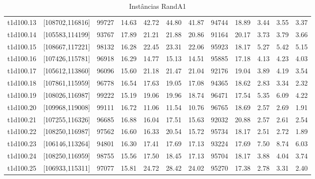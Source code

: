 \documentclass[a4paper,10pt,onecolumn]{article}
\begin{document}
{\begin{table}[htbp]
\begin{tabular*}{\linewidth}{|c|c|ccccc|ccccc|}
\\
t1d100.13 & [108702,116816] &
99727 & 14.63 & 42.72   & 44.80  & 41.87 
&
94744 & 18.89 & 3.44   & 3.55  & 3.37 
\\
t1d100.14 & [105583,114199] &
93767 & 17.89 & 21.21   & 21.88  & 20.86 
&
91164 & 20.17 & 3.73   & 3.79  & 3.66 
\\
t1d100.15 & [108667,117221] &
98132 & 16.28 & 22.45   & 23.31  & 22.06 
&
95923 & 18.17 & 5.27   & 5.42  & 5.15 
\\
t1d100.16 & [107426,115781] &
96918 & 16.29 & 14.77   & 15.13  & 14.51 
&
95885 & 17.18 & 4.13   & 4.23  & 4.03 
\\
t1d100.17 & [105612,113860] &
96096 & 15.60 & 21.18   & 21.47  & 21.04 
&
92176 & 19.04 & 3.89   & 4.19  & 3.54 
\\
t1d100.18 & [107861,115959] &
96778 & 16.54 & 17.63   & 19.05  & 17.08 
&
94365 & 18.62 & 2.83   & 3.34  & 2.32 
\\
t1d100.19 & [108026,116987] &
99222 & 15.19 & 19.06   & 19.96  & 18.74 
&
96471 & 17.54 & 5.35   & 6.09  & 4.22 
\\
t1d100.20 & [109968,119008] &
99111 & 16.72 & 11.06   & 11.54  & 10.76 
&
96765 & 18.69 & 2.57   & 2.69  & 1.91 
\\
t1d100.21 & [107255,116326] &
96685 & 16.88 & 16.04   & 17.51  & 15.63 
&
92032 & 20.88 & 2.57   & 2.61  & 2.54 
\\
t1d100.22 & [108250,116987] &
97562 & 16.60 & 16.33   & 20.54  & 15.72 
&
95734 & 18.17 & 2.51   & 2.72  & 1.89 
\\
t1d100.23 & [106146,113264] &
94801 & 16.30 & 17.41   & 17.69  & 17.13 
&
93224 & 17.69 & 7.50   & 8.74  & 6.03 
\\
t1d100.24 & [108250,116959] &
98755 & 15.56 & 17.50   & 18.45  & 17.13 
&
95704 & 18.17 & 3.88   & 4.04  & 3.74 
\\
t1d100.25 & [106933,115311] &
97077 & 15.81 & 24.72   & 28.42  & 24.02 
&
95270 & 17.38 & 2.78   & 3.31  & 2.40 
\\


    \hline
  \end{tabular*}
  \caption{Instâncias RandA1}
  \label{table:randa1}
\end{table}
\restoregeometry
\clearpage
}
\end{document}
